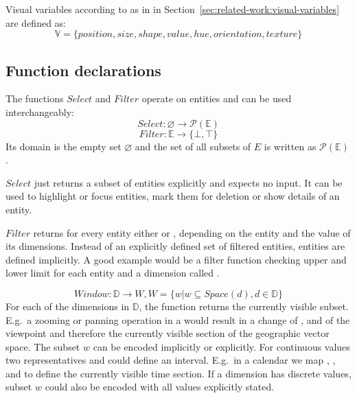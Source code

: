 Visual variables according to \textcite{Bertin2010} as in in Section~\ref{sec:related-work:visual-variables} are defined as:
\begin{equation} \mathbb{V} = \{position, size, shape, value, hue, orientation, texture\} \end{equation}


\subsection{Function declarations}
The functions $Select$ and $Filter$ operate on entities and can be used interchangeably:
\begin{equation} Select: \varnothing \rightarrow \mathcal{P}(\mathbb{E}) \end{equation}
\begin{equation} Filter: \mathbb{E} \rightarrow \{ \bot, \top \} \end{equation}
  Its domain is the empty set $\varnothing$ and the set of all subsets of $E$ is written as $ \mathcal{P}(\mathbb{E})$.

  $Select$ just returns a subset of entities explicitly and expects no input.
  It can be used to highlight or focus entities, mark them for deletion or show details of an entity.

  $Filter$ returns for every entity either  or , depending on the entity and the value of its dimensions.
  Instead of an explicitly defined set of filtered entities, entities are defined implicitly.
  A good example would be a filter function checking upper and lower limit for each entity and a dimension called .

\begin{equation} Window: \mathbb{D} \rightarrow W, W = \{w | w \subseteq Space(d), d \in \mathbb{D}\} \end{equation}
  For each of the dimensions in $\mathbb{D}$, the function returns the currently visible subset.
  E.g.\ a zooming or panning operation in a \gv{} would result in a change of ,  and  of the viewpoint and therefore the currently visible section of the geographic vector space.
  The subset $w$ can be encoded implicitly or explicitly.
  For continuous values two representatives  and  could define an interval.
  E.g.\ in a calendar we map , ,  and  to define the currently visible time section.
  If a dimension has discrete values, subset $w$ could also be encoded with all values explicitly stated.

